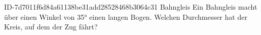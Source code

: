 \begin{exercise}
      {ID-7d7011f6d84a61138be31add28528468b3064c31}
      {Bahngleis}
  \ifproblem\problem
    Ein Bahngleis macht über einen Winkel von \ang{35} einen 
    langen Bogen. Welchen Durchmesser hat der Kreis, auf dem der Zug fährt?
  \fi
\end{exercise}

